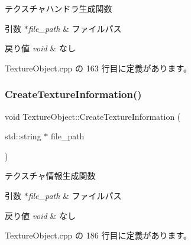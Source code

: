 テクスチャハンドラ生成関数 


\begin{DoxyParams}{引数}
{\em $\ast$file\+\_\+path} & ファイルパス \\
\hline
\end{DoxyParams}

\begin{DoxyRetVals}{戻り値}
{\em void} & なし \\
\hline
\end{DoxyRetVals}


 Texture\+Object.\+cpp の 163 行目に定義があります。

\mbox{\label{class_texture_object_a7e4b65c1b72ae85779b96178137966c8}} 
\subsubsection{\texorpdfstring{Create\+Texture\+Information()}{CreateTextureInformation()}}
{\footnotesize\ttfamily void Texture\+Object\+::\+Create\+Texture\+Information (\begin{DoxyParamCaption}\item[{std\+::string $\ast$}]{file\+\_\+path }\end{DoxyParamCaption})\hspace{0.3cm}{\ttfamily [private]}}



テクスチャ情報生成関数 


\begin{DoxyParams}{引数}
{\em $\ast$file\+\_\+path} & ファイルパス \\
\hline
\end{DoxyParams}

\begin{DoxyRetVals}{戻り値}
{\em void} & なし \\
\hline
\end{DoxyRetVals}


 Texture\+Object.\+cpp の 186 行目に定義があります。

\mbox{\label{class_texture_object_a49f22c5ad3a07b24530480d6ec2438d7}} 
